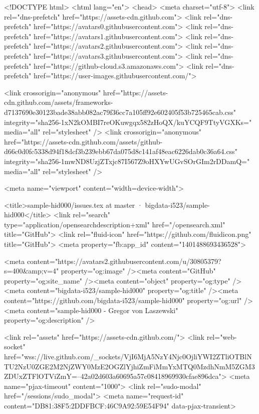 





<!DOCTYPE html>
<html lang="en">
  <head>
    <meta charset="utf-8">
  <link rel="dns-prefetch" href="https://assets-cdn.github.com">
  <link rel="dns-prefetch" href="https://avatars0.githubusercontent.com">
  <link rel="dns-prefetch" href="https://avatars1.githubusercontent.com">
  <link rel="dns-prefetch" href="https://avatars2.githubusercontent.com">
  <link rel="dns-prefetch" href="https://avatars3.githubusercontent.com">
  <link rel="dns-prefetch" href="https://github-cloud.s3.amazonaws.com">
  <link rel="dns-prefetch" href="https://user-images.githubusercontent.com/">



  <link crossorigin="anonymous" href="https://assets-cdn.github.com/assets/frameworks-d7137690e30123bade38abb082ac79f36cc7a105ff92e602405f53b725465cab.css" integrity="sha256-1xN2kOMBI7reOKuwgqx582zHoQX/kuYCQF9TtyVGXKs=" media="all" rel="stylesheet" />
  <link crossorigin="anonymous" href="https://assets-cdn.github.com/assets/github-d66c0d0fc5338d94f18dcf3b239ebb67da075d8c141af48eac6226dab0c36a64.css" integrity="sha256-1mwND8UzjZTxjc87I567Z9oHXYwUGvSOrGIm2rDDamQ=" media="all" rel="stylesheet" />
  
  
  
  

  <meta name="viewport" content="width=device-width">
  
  <title>sample-hid000/issues.tex at master · bigdata-i523/sample-hid000</title>
  <link rel="search" type="application/opensearchdescription+xml" href="/opensearch.xml" title="GitHub">
  <link rel="fluid-icon" href="https://github.com/fluidicon.png" title="GitHub">
  <meta property="fb:app_id" content="1401488693436528">

    
    <meta content="https://avatars2.githubusercontent.com/u/30805379?s=400&amp;v=4" property="og:image" /><meta content="GitHub" property="og:site_name" /><meta content="object" property="og:type" /><meta content="bigdata-i523/sample-hid000" property="og:title" /><meta content="https://github.com/bigdata-i523/sample-hid000" property="og:url" /><meta content="sample-hid000 - Gregor von Laszewski" property="og:description" />

  <link rel="assets" href="https://assets-cdn.github.com/">
  <link rel="web-socket" href="wss://live.github.com/_sockets/VjI6MjA5NzY4Njc0OjliYWI2ZTliOTBlNTU2NzU0ZGE2M2NjZWY0MzE2OGZlYjhiZmFiMmYxMTQ0MzdhNmM5ZGM3ZDUxZTFlOTViZmY=--42a02d603a60695a57c08418969930cfae896dca">
  <meta name="pjax-timeout" content="1000">
  <link rel="sudo-modal" href="/sessions/sudo_modal">
  <meta name="request-id" content="DB81:38F5:2DDFBCF:46C9A92:59E54F94" data-pjax-transient>
  

